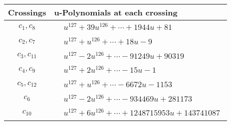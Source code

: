 \documentclass[1p]{elsarticle_modified}
\theoremstyle{definition}
\begin{document}
\begin{tabular}{m{50pt}|m{274pt}}
Crossings & \hspace{64pt}u-Polynomials at each crossing \\
\hline $$\begin{aligned}c_{1},c_{8}\end{aligned}$$&$\begin{aligned}
&u^{127}+39 u^{126}+\cdots+1944 u+81
\end{aligned}$\\
\hline $$\begin{aligned}c_{2},c_{7}\end{aligned}$$&$\begin{aligned}
&u^{127}+u^{126}+\cdots+18 u-9
\end{aligned}$\\
\hline $$\begin{aligned}c_{3},c_{11}\end{aligned}$$&$\begin{aligned}
&u^{127}-2 u^{126}+\cdots-91249 u+90319
\end{aligned}$\\
\hline $$\begin{aligned}c_{4},c_{9}\end{aligned}$$&$\begin{aligned}
&u^{127}+2 u^{126}+\cdots-15 u-1
\end{aligned}$\\
\hline $$\begin{aligned}c_{5},c_{12}\end{aligned}$$&$\begin{aligned}
&u^{127}+u^{126}+\cdots-6672 u-1153
\end{aligned}$\\
\hline $$\begin{aligned}c_{6}\end{aligned}$$&$\begin{aligned}
&u^{127}-2 u^{126}+\cdots-934469 u+281173
\end{aligned}$\\
\hline $$\begin{aligned}c_{10}\end{aligned}$$&$\begin{aligned}
&u^{127}+6 u^{126}+\cdots+1248715953 u+143741087
\end{aligned}$\\
\hline
\end{tabular}\\~\\
\end{document}
